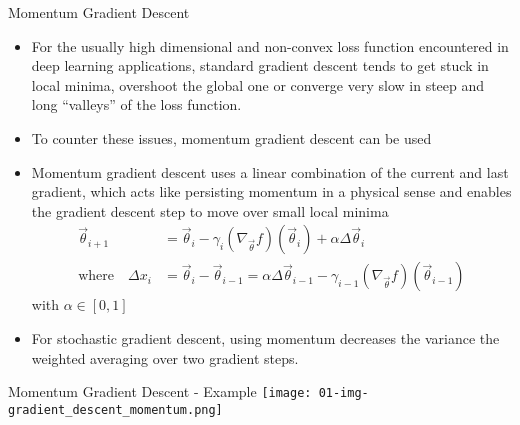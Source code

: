   \begin{frame}{Momentum Gradient Descent}
    \begin{itemize}
      \item For the usually high dimensional and non-convex loss function encountered in deep learning applications, standard gradient descent tends to get stuck in local minima, overshoot the global one or converge very slow in steep and long \enquote{valleys} of the loss function.
      \item To counter these issues, momentum gradient descent can be used
      \item Momentum gradient descent uses a linear combination of the current and last gradient, which acts like persisting momentum in a physical sense and enables the gradient descent step to move over small local minima
      \begin{align*}
        \vec{\theta}_{i+1} &= \vec{\theta}_i
          - \gamma_i (\nabla_{\vec{\theta}}f)(\vec{\theta}_i)
          + \alpha\Delta \vec{\theta}_i \\
        \text{where}\quad \Delta x_i &= \vec{\theta}_i - \vec{\theta}_{i-1}
          = \alpha \Delta \vec{\theta}_{i-1}
            - \gamma_{i-1} (\nabla_{\vec{\theta}}f)(\vec{\theta}_{i-1})
      \end{align*}
      with $\alpha\in[0, 1]$
      \item For stochastic gradient descent, using momentum decreases the variance the weighted averaging over two gradient steps.
    \end{itemize}
  \end{frame}

  \begin{frame}{Momentum Gradient Descent - Example}
    \texttt{[image: 01-img-gradient\_descent\_momentum.png]}
  \end{frame}

